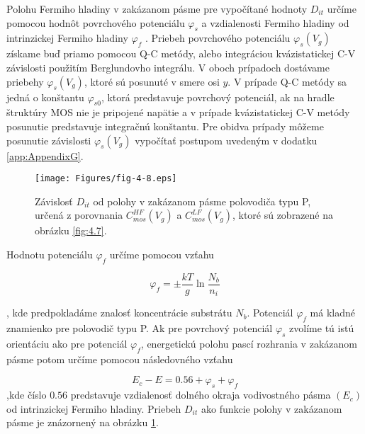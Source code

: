 \par Polohu Fermiho hladiny v zakázanom pásme pre vypočítané hodnoty
$D_{it}$ určíme pomocou hodnôt povrchového potenciálu $\varphi_{s}$ a
vzdialenosti Fermiho hladiny od intrinzickej Fermiho hladiny
$\varphi_{f}$ . Priebeh povrchového potenciálu $\varphi_{s}(V_{g})$
získame buď priamo pomocou Q-C metódy, alebo integráciou
kvázistatickej C-V závislosti použitím Berglundovho integrálu. V oboch
prípadoch dostávame priebehy $\varphi_{s}(V_{g})$, ktoré sú posunuté v
smere osi $y$. V prípade Q-C metódy sa jedná o konštantu
$\varphi_{s0}$, ktorá predstavuje povrchový potenciál, ak na hradle
štruktúry MOS nie je pripojené napätie a v prípade kvázistatickej C-V
metódy posunutie predstavuje integračnú konštantu. Pre obidva prípady
môžeme posunutie závislosti $\varphi_{s}(V_{g})$ vypočítať postupom
uvedeným v dodatku \ref{app:AppendixG}.

\begin{figure}[h!]\centering
\texttt{[image: Figures/fig-4-8.eps]}
\captionsetup{justification=raggedright, singlelinecheck=false}
\caption[Závislosť $D_{it}$ od polohy v zakázanom pásme polovodiča
  typu P, určená z porovnania $C_{mos}^{HF}(V_{g})$ a
  $C_{mos}^{LF}(V_{g})$]{Závislosť $D_{it}$ od polohy v zakázanom
  pásme polovodiča typu P, určená z porovnania $C_{mos}^{HF}(V_{g})$ a
  $C_{mos}^{LF}(V_{g})$, ktoré sú zobrazené na obrázku \ref{fig:4.7}.}
\label{fig:4.8}
\end{figure}

Hodnotu potenciálu $\varphi_{f}$ určíme pomocou vzťahu

\begin{equation}\label{eq:4.16}
\varphi_{f} = \pm \frac{kT}{g} \ln{\frac{N_{b}}{n_{i}}}
\end{equation}

, kde predpokladáme znalosť koncentrácie substrátu $N_{b}$.  Potenciál
$\varphi_{f}$ má kladné znamienko pre polovodič typu P. Ak pre
povrchový potenciál $\varphi_{s}$ zvolíme tú istú orientáciu ako pre
potenciál $\varphi_{f}$, energetickú polohu pascí rozhrania v
zakázanom pásme potom určíme pomocou následovného vzťahu

\begin{equation}\label{eq:4.17}
E_{c} - E = 0.56 + \varphi_{s} + \varphi_{f}
\end{equation}
,kde číslo $0.56$ predstavuje vzdialenosť dolného okraja vodivostného
pásma $(E_{c})$ od intrinzickej Fermiho hladiny. Priebeh $D_{it}$ ako
funkcie polohy v zakázanom pásme je znázornený na obrázku
\ref{fig:4.8}.


